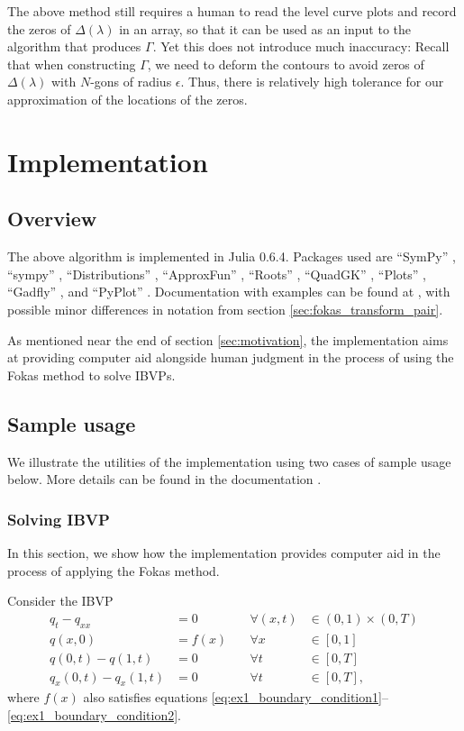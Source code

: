 \documentclass[12pt, oneside, a4paper]{article}
\begin{document}
The above method still requires a human to read the level curve plots and record the zeros of $\Delta(\lambda)$ in an array, so that it can be used as an input to the algorithm that produces $\Gamma$. Yet this does not introduce much inaccuracy: Recall that when constructing $\Gamma$, we need to deform the contours to avoid zeros of $\Delta(\lambda)$ with $N$-gons of radius $\epsilon$. Thus, there is relatively high tolerance for our approximation of the locations of the zeros.

\section{Implementation}
\subsection{Overview}
The above algorithm is implemented in Julia 0.6.4. Packages used are ``SymPy'' \cite{sympy}, ``sympy'' \cite{sympyPython},  ``Distributions'' \cite{distributions}, ``ApproxFun'' \cite{approxfun}, ``Roots'' \cite{roots}, ``QuadGK'' \cite{quadgk}, ``Plots'' \cite{plots}, ``Gadfly'' \cite{gadfly}, and ``PyPlot'' \cite{pyplot}. Documentation with examples can be found at \cite{Xiao}, with possible minor differences in notation from section \ref{sec:fokas_transform_pair}.

As mentioned near the end of section \ref{sec:motivation}, the implementation aims at providing computer aid alongside human judgment in the process of using the Fokas method to solve IBVPs.

\subsection{Sample usage}
We illustrate the utilities of the implementation using two cases of sample usage below. More details can be found in the documentation \cite{Xiao}.

\subsubsection{Solving IBVP}\label{sec:ex1}
In this section, we show how the implementation provides computer aid in the process of applying the Fokas method.

Consider the IBVP
\begin{subequations}\label{eq:ex1}
    \begin{alignat}{3}
        q_t - q_{xx} &= 0\quad &\forall (x,t)&\in (0,1)\times (0,T) \label{eq:ex1_PDE}\\
        q(x,0) &= f(x) \quad &\forall x&\in [0,1]\label{eq:ex1_initial_condition}\\
        q(0,t) - q(1,t) &= 0 &\forall t&\in [0,T]\label{eq:ex1_boundary_condition1}\\
        q_x(0,t) - q_x(1,t) &= 0 &\forall t&\in [0,T]\label{eq:ex1_boundary_condition2},
    \end{alignat}
\end{subequations}
where $f(x)$ also satisfies equations \eqref{eq:ex1_boundary_condition1}--\eqref{eq:ex1_boundary_condition2}.
\end{document}
